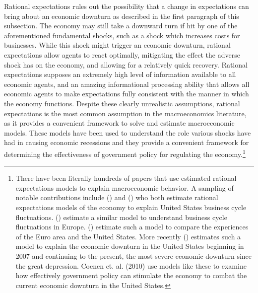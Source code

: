 \documentclass[11pt]{article}
\newcommand{\citee}[1]{\citename{#1} (\citeyear{#1})}
\begin{document}
Rational expectations rules out the possibility that a change in expectations can bring about an economic downturn as described in the first paragraph of this subsection.  The economy may still take a downward turn if hit by one of the aforementioned fundamental shocks, such as a shock which increases costs for businesses.  While this shock might trigger an economic downturn, rational expectations allow agents to react optimally, mitigating the effect the adverse shock has on the economy, and allowing for a relatively quick recovery.  Rational expectations supposes an extremely high level of information available to all economic agents, and an amazing informational processing ability that allows all economic agents to make expectations fully consistent with the manner in which the economy functions.  Despite these clearly unrealistic assumptions, rational expectations is the most common assumption in the macroeconomics literature, as it provides a convenient framework to solve and estimate macroeconomic models.  These models have been used to understand the role various shocks have had in causing economic recessions and they provide a convenient framework for determining the effectiveness of government policy for regulating the economy.\footnote{There have been literally hundreds of papers that use estimated rational expectations models to explain macroeconomic behavior.  A sampling of notable contributions include \citee{ireland_tech_2004} and \citee{smetswouters2007} who both estimate rational expectations models of the economy to explain United States business cycle fluctuations.  \citee{smetswouters2003} estimate a similar model to understand business cycle fluctuations in Europe.  \citee{smetswouters2005} estimate such a model to compare the experiences of the Euro area and the United States.  More recently \citee{ireland_greatrecession_2011} estimates such a model to explain the economic downturn in the United States beginning in 2007 and continuing to the present, the most severe economic downturn since the great depression.  Coenen et. al. (2010) use models like these to examine how effectively government policy can stimulate the economy to combat the current economic downturn in the United States.}
\end{document}
